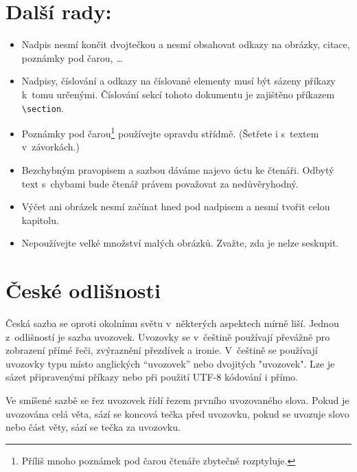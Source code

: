 \documentclass[a4paper, twocolumn, 10pt]{article}
\begin{document}
\section{Další rady:}\label{sec:dalsi_rady}
\begin{itemize}
	\item Nadpis nesmí končit dvojtečkou a nesmí obsahovat odkazy na obrázky, citace, poznámky pod čarou, \dots

	\item Nadpisy, číslování a odkazy na číslované elementy musí být sázeny příkazy k~tomu určenými. Číslování sekcí tohoto dokumentu je zajištěno příkazem \verb|\section|.

	\item Poznámky pod čarou\footnote{Příliš mnoho poznámek pod čarou čtenáře zbytečně rozptyluje.} používejte opravdu střídmě.
	      (Šetřete i s~textem v~závorkách.)

	\item Bezchybným pravopisem a sazbou dáváme najevo úctu ke čtenáři. Odbytý text s~chybami bude čtenář právem považovat za nedůvěryhodný.

	\item Výčet ani obrázek nesmí začínat hned pod nadpisem a nesmí tvořit celou kapitolu.

	\item Nepoužívejte velké množství malých obrázků.
	      Zvažte, zda je nelze seskupit.
\end{itemize}

\section{České odlišnosti}

Česká sazba se oproti okolnímu světu v~některých aspektech mírně liší.
Jednou z~odlišností je sazba uvozovek.
Uvozovky se v~češtině používají převážně pro zobrazení přímé řeči, zvýraznění přezdívek a ironie.
V~češtině se používají uvozovky typu  místo anglických ``uvozovek'' nebo dvojitých "uvozovek".
Lze je sázet připravenými příkazy nebo při použití UTF-8 kódování i přímo.

Ve smíšené sazbě se řez uvozovek řídí řezem prvního uvozovaného slova.
Pokud je uvozována celá věta, sází se koncová tečka před uvozovku, pokud se uvozuje slovo nebo část věty, sází se tečka za uvozovku.
\end{document}
